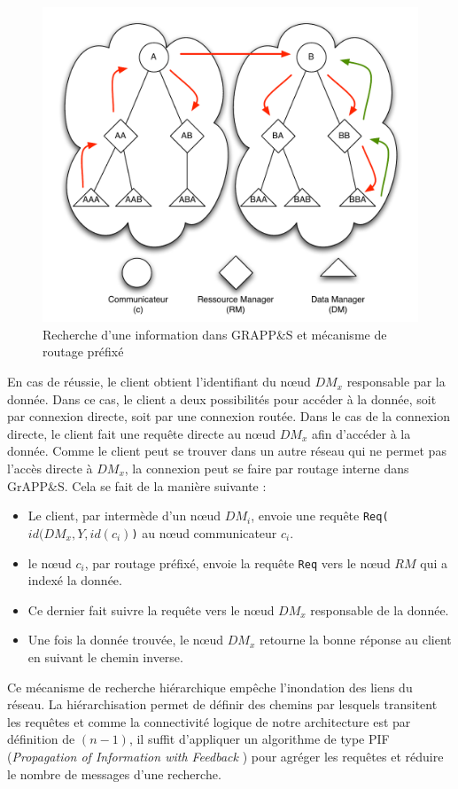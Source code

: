 \begin{figure}
	\centering
	\includegraphics[width=0.8\linewidth]{img/Routage1.pdf} 
	\caption{Recherche d'une information dans GRAPP\&S et mécanisme de routage préfixé\label{fig:routage}}
\end{figure}

En cas de réussie, le client obtient l'identifiant du n{\oe}ud $DM_x$ responsable par la donnée. Dans ce cas, le client a deux possibilités pour accéder à la donnée, soit par connexion directe, soit par une connexion routée. Dans le cas de la connexion directe, le client fait une requête directe au n{\oe}ud $DM_x$ afin d'accéder à la  donnée. Comme le client peut se trouver dans un autre réseau qui ne permet pas l'accès directe à $DM_x$, la connexion peut se faire par routage interne dans GrAPP\&S. Cela se fait de la manière suivante :
\begin{itemize}
	\item Le client, par intermède d'un n{\oe}ud $DM_i$, envoie une requête \texttt{Req($id(DM_x, Y, id(c_i)$)} au n{\oe}ud communicateur $c_i$.
	\item  le n{\oe}ud $c_i$, par routage préfixé, envoie la requête \texttt{Req} vers le n{\oe}ud $RM$ qui a indexé la donnée.
	\item  Ce dernier fait suivre la requête vers le n{\oe}ud $DM_x$ responsable de la donnée.
	\item Une fois la donnée trouvée, le n{\oe}ud $DM_x$ retourne la bonne réponse au client en suivant le chemin inverse.
\end{itemize}   

Ce mécanisme de recherche hiérarchique empêche l'inondation des liens du réseau. La hiérarchisation permet de définir des chemins par lesquels transitent les requêtes et comme la connectivité logique de notre architecture est par définition de $(n-1)$, il suffit d'appliquer un algorithme de type PIF (\textit{Propagation of Information with Feedback} \cite{Seg83}) pour agréger les requêtes et réduire le nombre de messages d'une recherche.  


